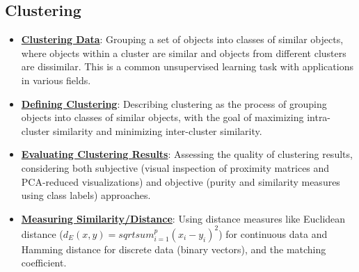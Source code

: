 \documentclass{article}%
\begin{document}
\subsection{Clustering}%
\label{subsec:Clustering}%
\begin{itemize}[leftmargin=*]%
\item \href{https://purdue.brightspace.com/d2l/common/assets/pdfjs-d2l-dist/1.0.14-legacy/web/viewer.html?file=\%2Fcontent\%2Fenforced\%2F1095467-wl.202510.CS.24300.001\%2F12L2-distance-clusters.pdf\%3Fou\%3D1095467\&lang=en-us\&container=d2l-fileviewer-rendered-pdf\&fullscreen=d2l-fileviewer-rendered-pdf-dialog\&height=667#page=4}{\textbf{Clustering Data}}: Grouping a set of objects into classes of similar objects, where objects within a cluster are similar and objects from different clusters are dissimilar. This is a common unsupervised learning task with applications in various fields.%
\item \href{https://purdue.brightspace.com/d2l/common/assets/pdfjs-d2l-dist/1.0.14-legacy/web/viewer.html?file=\%2Fcontent\%2Fenforced\%2F1095467-wl.202510.CS.24300.001\%2F12L2-distance-clusters.pdf\%3Fou\%3D1095467\&lang=en-us\&container=d2l-fileviewer-rendered-pdf\&fullscreen=d2l-fileviewer-rendered-pdf-dialog\&height=667#page=4}{\textbf{Defining Clustering}}: Describing clustering as the process of grouping objects into classes of similar objects, with the goal of maximizing intra-cluster similarity and minimizing inter-cluster similarity.%
\item \href{https://purdue.brightspace.com/d2l/common/assets/pdfjs-d2l-dist/1.0.14-legacy/web/viewer.html?file=\%2Fcontent\%2Fenforced\%2F1095467-wl.202510.CS.24300.001\%2F12L2-distance-clusters.pdf\%3Fou\%3D1095467\&lang=en-us\&container=d2l-fileviewer-rendered-pdf\&fullscreen=d2l-fileviewer-rendered-pdf-dialog\&height=667#page=32}{\textbf{Evaluating Clustering Results}}: Assessing the quality of clustering results, considering both subjective (visual inspection of proximity matrices and PCA-reduced visualizations) and objective (purity and similarity measures using class labels) approaches.%
\item \href{https://purdue.brightspace.com/d2l/common/assets/pdfjs-d2l-dist/1.0.14-legacy/web/viewer.html?file=\%2Fcontent\%2Fenforced\%2F1095467-wl.202510.CS.24300.001\%2F12L2-distance-clusters.pdf\%3Fou\%3D1095467\&lang=en-us\&container=d2l-fileviewer-rendered-pdf\&fullscreen=d2l-fileviewer-rendered-pdf-dialog\&height=667#page=17}{\textbf{Measuring Similarity/Distance}}: Using distance measures like Euclidean distance ($d_E(x, y) =  sqrt{ sum_{i=1}^p (x_i - y_i)^2}$) for continuous data and Hamming distance for discrete data (binary vectors), and the matching coefficient.%

\end{itemize}
\end{document}
